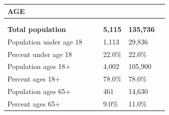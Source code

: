 \documentclass[9pt]{report}
\begin{document}
\vspace{24pt}
\setlength{\tabcolsep}{.01in} %
\begin{tabular}{p{.10in}p{.10in}p{.10in}p{3.7in}>{\hfill}p{.85in}>{\hfill}p{.85in}>{\hfill}p{.85in}>{\hfill}p{.85in}p{0.1in}}
\multicolumn{9}{l}{\parbox{7.1in}{\raggedright{\large{\strut\textbf{AGE}\strut}}}} \\ 
\hline
\multicolumn{4}{l}{\parbox{3.5in}{\raggedright{\textbf{}}}} & \multicolumn{1}{r}{\parbox{.85in}{\strut\raggedleft{\textbf{}\strut}}} & \multicolumn{1}{r}{\parbox{.85in}{\strut\raggedleft{\textbf{}\strut}}} & \multicolumn{1}{r}{\parbox{.85in}{\strut{}}} & \multicolumn{1}{r}{\parbox{.85in}{\strut{}}} & \\ 
\multicolumn{9}{l}{} \\ 
\multicolumn{4}{l}{\parbox{3.5in}{\strut\raggedright{\textbf{Total population}\strut}}} & \textbf{} & \textbf{} & \textbf{5,115} & \textbf{135,736} & \textbf{} \\ 
\multicolumn{4}{l}{\parbox{3.6in}{\strut\raggedright{{Population under age 18}}\strut}} &  &  & 1,113 & 29,836 & \multicolumn{1}{l}{}  \\ 
\multicolumn{4}{l}{\parbox{3.6in}{\strut\raggedright{{Percent under age 18}}\strut}} &  &  & 22.0\% & 22.0\% & \multicolumn{1}{l}{}  \\ 
\multicolumn{4}{l}{\parbox{3.6in}{\strut\raggedright{{Population ages 18+}}\strut}} &  &  & 4,002 & 105,900 & \multicolumn{1}{l}{}  \\ 
\multicolumn{4}{l}{\parbox{3.6in}{\strut\raggedright{{Percent ages 18+}}\strut}} &  &  & 78.0\% & 78.0\% & \multicolumn{1}{l}{}  \\ 
\multicolumn{4}{l}{\parbox{3.6in}{\strut\raggedright{{Population ages 65+}}\strut}} &  &  & 461 & 14,630 & \multicolumn{1}{l}{}  \\ 
\multicolumn{4}{l}{\parbox{3.6in}{\strut\raggedright{{Percent ages 65+}}\strut}} &  &  & 9.0\% & 11.0\% & \multicolumn{1}{l}{}  \\ 

\end{tabular}
\setlength{\tabcolsep}{6pt} %
\end{document}
